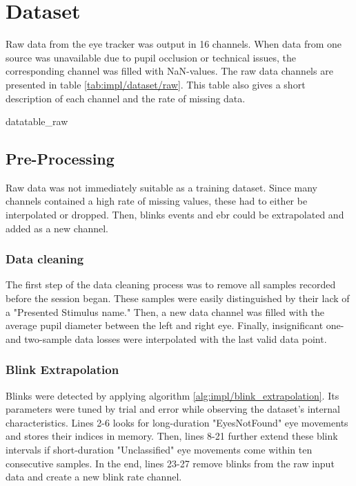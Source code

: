 \section{Dataset} \label{sec:impl/dataset}

Raw data from the eye tracker was output in 16 channels. 
When data from one source was unavailable due to pupil occlusion or technical issues, the corresponding channel was filled with NaN-values. The raw data channels are presented in table \ref{tab:impl/dataset/raw}. This table also gives a short description of each channel and the rate of missing data.

{datatable_raw}

\subsection{Pre-Processing}

Raw data was not immediately suitable as a training dataset. Since many channels contained a high rate of missing values, these had to either be interpolated or dropped. Then, blinks events and \acrshort{ebr} could be extrapolated and added as a new channel.

\subsubsection{Data cleaning}

The first step of the data cleaning process was to remove all samples recorded before the session began. These samples were easily distinguished by their lack of a "Presented Stimulus name." Then, a new data channel was filled with the average pupil diameter between the left and right eye. Finally, insignificant one- and two-sample data losses were interpolated with the last valid data point.

\subsubsection{Blink Extrapolation}

Blinks were detected by applying algorithm \ref{alg:impl/blink_extrapolation}. Its parameters were tuned by trial and error while observing the dataset's internal characteristics. Lines 2-6 looks for long-duration "EyesNotFound" eye movements and stores their indices in memory. Then, lines 8-21 further extend these blink intervals if short-duration "Unclassified" eye movements come within ten consecutive samples. In the end, lines 23-27 remove blinks from the raw input data and create a new blink rate channel.

